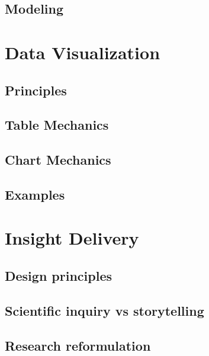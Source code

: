 \documentclass[
]{book}
\begin{document}
\hypertarget{modeling}{%
\section{Modeling}\label{modeling}}

\hypertarget{data_viz}{%
\chapter{Data Visualization}\label{data_viz}}

\hypertarget{principles}{%
\section{Principles}\label{principles}}

\hypertarget{table-mechanics}{%
\section{Table Mechanics}\label{table-mechanics}}

\hypertarget{chart-mechanics}{%
\section{Chart Mechanics}\label{chart-mechanics}}

\hypertarget{examples}{%
\section{Examples}\label{examples}}

\hypertarget{insight_delivery}{%
\chapter{Insight Delivery}\label{insight_delivery}}

\hypertarget{design-principles}{%
\section{Design principles}\label{design-principles}}

\hypertarget{scientific-inquiry-vs-storytelling}{%
\section{Scientific inquiry vs storytelling}\label{scientific-inquiry-vs-storytelling}}

\hypertarget{research-reformulation}{%
\section{Research reformulation}\label{research-reformulation}}
\end{document}

